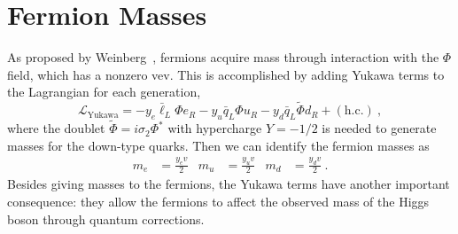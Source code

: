 \section{Fermion Masses}
\label{sec:fermionmasses}
As proposed by Weinberg~\cite{PhysRevLett.19.1264}, fermions acquire
mass through interaction with the $\Phi$ field, which has a nonzero
vev. This is accomplished by adding Yukawa terms to the Lagrangian for
each generation,
\begin{equation}
\mathcal L_{\mathrm{Yukawa}} = - y_e \bar\ell_L\Phi e_R -
y_u\bar q_L\Phi u_R  - y_d\bar q_L\tilde\Phi d_R + (\mathrm{h.c.})~,
\end{equation}
where the doublet $\tilde\Phi = i\sigma_2\Phi^{\ast}$ with hypercharge $Y=-1/2$ is
needed to generate masses for the down-type quarks. Then we can
identify the fermion masses as
\begin{align}
m_e &= \frac{y_e v}{2}&m_u &= \frac{y_u
                                          v}{2}& m_d &= \frac{y_dv}{2}~.
\end{align}
Besides giving masses to the fermions, the Yukawa terms have another important
consequence: they allow the fermions to affect the
observed mass of the Higgs boson through quantum corrections.

